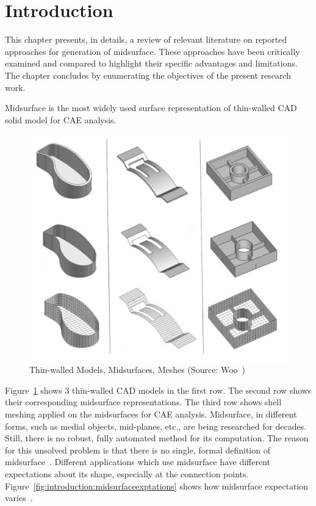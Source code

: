\section{Introduction} \label{sec:survey:intro}

This chapter presents, in details, a review of relevant literature on reported approaches for generation of midsurface. These approaches have been critically examined and compared to highlight their specific advantages and limitations. The chapter concludes by enumerating the objectives of the present research work.


Midsurface is the most widely used surface representation of thin-walled CAD solid model for CAE analysis. 


		\begin{figure} [!h]
		\centering
		\includegraphics[width=0.75\linewidth]{images/WooMidsurfaces.pdf}
		\caption{Thin-walled Models, Midsurfaces, Meshes (Source: Woo~\cite{Woo2013})}
		\label{fig:introduction:woomids}
	\end{figure}
	

Figure~\ref{fig:introduction:woomids} shows 3 thin-walled CAD models in the first row. The second row shows their corresponding midsurface representations. The third row shows shell meshing applied on the midsurfaces for CAE analysis. Midsurface, in different forms, such as medial objects, mid-planes, etc., are being researched for decades. Still, there is no robust, fully automated method for its computation. The reason for this unsolved problem is that there is no single, formal definition of midsurface~\cite{Ramanathan2004}. Different applications which use midsurface have different expectations about its shape, especially at the connection points. Figure~\ref{fig:introduction:midsurfaceexptations} shows how midsurface expectation varies~\cite{Woo2013}.


